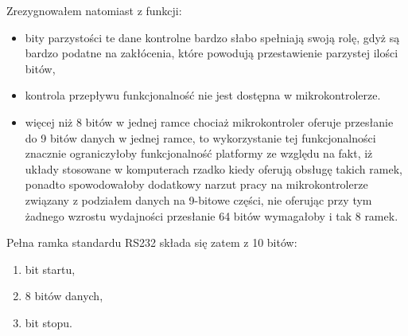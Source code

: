 Zrezygnowałem natomiast z funkcji:
\begin{itemize}
 \item bity parzystości \ppauza te dane kontrolne bardzo słabo spełniają swoją rolę, gdyż są bardzo podatne na zakłócenia, które powodują przestawienie parzystej ilości bitów,
 \item kontrola przepływu \ppauza funkcjonalność nie jest dostępna w mikrokontrolerze.
 \item więcej niż 8 bitów w jednej ramce \ppauza chociaż mikrokontroler oferuje przesłanie do 9 bitów danych w jednej ramce, to wykorzystanie tej funkcjonalności znacznie ograniczyłoby funkcjonalność platformy ze względu na fakt, iż układy stosowane w komputerach rzadko kiedy oferują obsługę takich ramek, ponadto spowodowałoby dodatkowy narzut pracy na mikrokontrolerze związany z podziałem danych na 9-bitowe części, nie oferując przy tym żadnego wzrostu wydajności \ppauza przesłanie 64 bitów wymagałoby i tak 8 ramek.
\end{itemize}

Pełna ramka standardu RS232 składa się zatem z 10 bitów:
\begin{enumerate}
 \item bit startu,
 \item 8 bitów danych,
 \item bit stopu.
\end{enumerate}